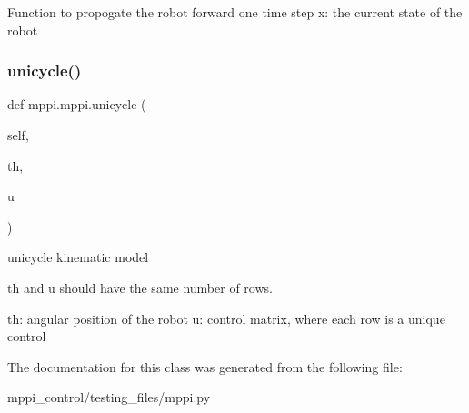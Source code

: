 \begin{DoxyVerb}Function to propogate the robot forward one time step
x: the current state of the robot
\end{DoxyVerb}
 \mbox{\label{classmppi_1_1mppi_a2729bb6fc99b1f9d5e4bf0b4e266cb28}} 
\subsubsection{\texorpdfstring{unicycle()}{unicycle()}}
{\footnotesize\ttfamily def mppi.\+mppi.\+unicycle (\begin{DoxyParamCaption}\item[{}]{self,  }\item[{}]{th,  }\item[{}]{u }\end{DoxyParamCaption})}

\begin{DoxyVerb}unicycle kinematic model

th and u should have the same number of rows.

th: angular position of the robot
u: control matrix, where each row is a unique control
\end{DoxyVerb}
 

The documentation for this class was generated from the following file\+:\begin{DoxyCompactItemize}
\item 
mppi\+\_\+control/testing\+\_\+files/mppi.\+py\end{DoxyCompactItemize}

